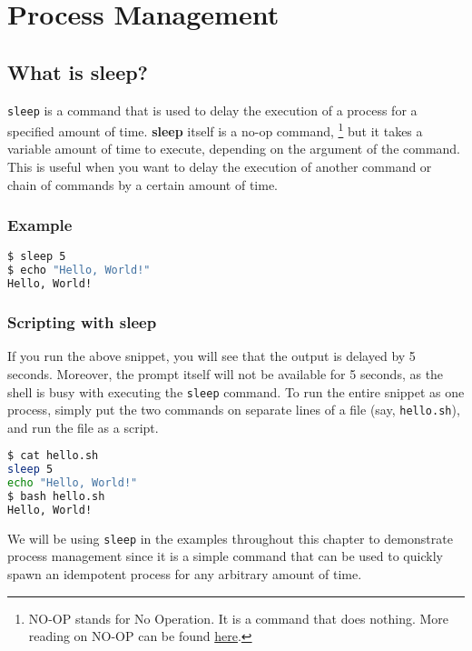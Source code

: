 \chapter{Process Management}

\section{What is sleep?}

\lstinline|sleep| is a command that is used to delay the execution of a process
for a specified amount of time. \textbf{sleep} itself is a no-op command,
\footnote{
  NO-OP stands for No Operation. It is a command that does nothing.
  More reading on NO-OP can be found
  \href{https://en.wikipedia.org/wiki/NOP\_(code)}{here}.
}
but it takes a variable amount of time to execute, depending on the argument
of the command. This is useful when you want to delay the execution of another
command or chain of commands by a certain amount of time.

\subsection{Example}

\begin{lstlisting}[language=bash]
$ sleep 5
$ echo "Hello, World!"
Hello, World!
\end{lstlisting}

\subsection{Scripting with sleep}

If you run the above snippet, you will see that the output is delayed by 5 seconds.
Moreover, the prompt itself will not be available for 5 seconds, as the shell is busy
with executing the \lstinline|sleep| command.
To run the entire snippet as one process, simply put the two commands on
separate lines of a file (say, \lstinline|hello.sh|), and run the file as a script.

\begin{lstlisting}[language=bash]
$ cat hello.sh
sleep 5
echo "Hello, World!"
$ bash hello.sh
Hello, World!
\end{lstlisting}

We will be using \lstinline|sleep| in the examples throughout this chapter to demonstrate
process management since it is a simple command that can be used to quickly
spawn an idempotent process for any arbitrary amount of time.

